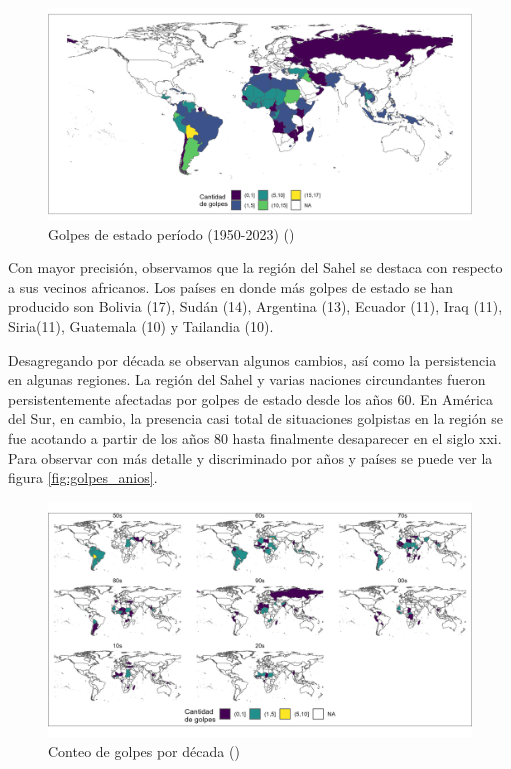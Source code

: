 \documentclass{article}
\begin{document}
\begin{figure}[H]
  \centering  
  \includegraphics[width=1\textwidth]{2_golpes.png}
  \caption{Golpes de estado período (1950-2023) (\cite{Pow11}) \label{fig::mapa_golpes}}
\end{figure}

Con mayor precisión, observamos que la región del Sahel se destaca con respecto a sus
vecinos africanos. Los países en donde más golpes de estado se han producido son
Bolivia (17), Sudán (14), Argentina (13), Ecuador (11), Iraq (11), Siria(11), 
Guatemala (10) y Tailandia (10).

Desagregando por década se observan algunos cambios, así como la persistencia en 
algunas regiones. La región del Sahel y varias naciones circundantes fueron 
persistentemente afectadas por golpes de estado desde los años 60. En América del 
Sur, en cambio, la presencia casi total de situaciones golpistas en la región se 
fue acotando a partir de los años 80 hasta finalmente desaparecer en el siglo 
xxi. Para observar con más detalle y discriminado por años y países se puede ver 
la figura \ref{fig:golpes_anios}.

\begin{figure}[H]
  \centering  
  \includegraphics[width=1\textwidth]{3_golpes_decadas.png}
  \caption{Conteo de golpes por década (\cite{Pow11}) \label{fig:golpes_decadas}}
\end{figure}
\end{document}
